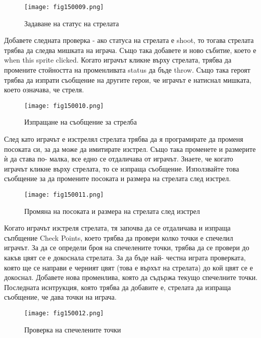 \begin{figure}[H]
  \centering
  \texttt{[image: fig150009.png]}
  \caption{Задаване на статус на стрелата}
\label{fig150009}
\end{figure}

Добавете следната проверка - ако статуса на стрелата е shoot, то тогава стрелата трябва да следва мишката на играча. Също така добавете и ново събитие, което е when this sprite clicked. Когато играчът кликне върху стрелата, трябва да промените стойността на променливата status да бъде throw. Също така героят трябва да изпрати съобщение на другите герои, че играчът е натиснал мишката, което означава, че стреля.

\begin{figure}[H]
  \centering
  \texttt{[image: fig150010.png]}
  \caption{Изпращане на съобщение за стрелба}
\label{fig150010}
\end{figure}

След като играчът е изстрелял стрелата трябва да я програмирате да променя посоката си, за да може да имитирате изстрел. Също така променете и размерите ѝ да става по- малка, все едно се отдаличава от играчът. Знаете, че когато играчът кликне върху стрелата, то се изпраща съобщение. Използвайте това съобщение за да промените посоката и размера на стрелата след изстрел.

\begin{figure}[H]
  \centering
  \texttt{[image: fig150011.png]}
  \caption{Промяна на посоката и размера на стрелата след изстрел}
\label{fig150011}
\end{figure}

Когато играчът изстреля стрелата, тя започва да се отдаличава и изпраща съпбщение Check Points, което трябва да провери колко точки е спечелил играчът. За да се определи броя на спечелените точки, трябва да се провери до какъв цвят се е докоснала стрелата. За да бъде най- честна играта проверката, която ще се направи е черният цвят (това е върхът на стрелата) до кой цвят се е докоснал. Добавете нова променлива, която да съдържа текущо спечелните точки. Последната иснтрукция, която трябва да добавите е, стрелата да изпраща съобщение, че дава точки на играча.

\begin{figure}[H]
  \centering
  \texttt{[image: fig150012.png]}
  \caption{Проверка на спечелените точки}
\label{fig150012}
\end{figure}

